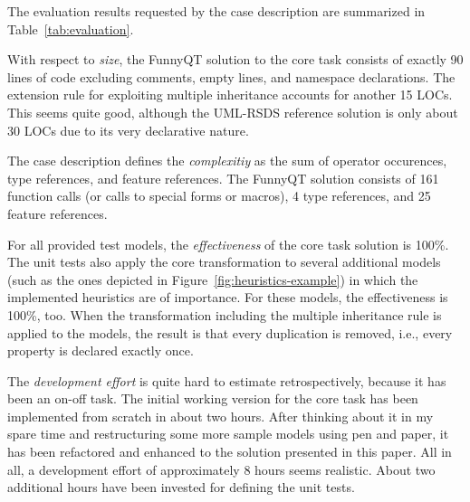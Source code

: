 \documentclass[11pt]{article}
\begin{document}
The evaluation results requested by the case description
\cite{cdrestructcasedesc} are summarized in Table~\ref{tab:evaluation}.

With respect to \emph{size}, the FunnyQT solution to the core task consists of
exactly 90 lines of code excluding comments, empty lines, and namespace
declarations.  The extension rule for exploiting multiple inheritance accounts
for another 15 LOCs.  This seems quite good, although the UML-RSDS reference
solution is only about 30 LOCs due to its very declarative nature.

The case description defines the \emph{complexitiy} as the sum of operator
occurences, type references, and feature references.  The FunnyQT solution
consists of 161 function calls (or calls to special forms or macros), 4 type
references, and 25 feature references.

For all provided test models, the \emph{effectiveness} of the core task
solution is 100\%.  The unit tests also apply the core transformation to
several additional models (such as the ones depicted in
Figure~\ref{fig:heuristics-example}) in which the implemented heuristics are of
importance.  For these models, the effectiveness is 100\%, too.  When the
transformation including the multiple inheritance rule is applied to the
models, the result is that every duplication is removed, i.e., every property
is declared exactly once.

The \emph{development effort} is quite hard to estimate retrospectively,
because it has been an on-off task.  The initial working version for the core
task has been implemented from scratch in about two hours.  After thinking
about it in my spare time and restructuring some more sample models using pen
and paper, it has been refactored and enhanced to the solution presented in
this paper.  All in all, a development effort of approximately 8 hours seems
realistic.  About two additional hours have been invested for defining the unit
tests.
\end{document}
